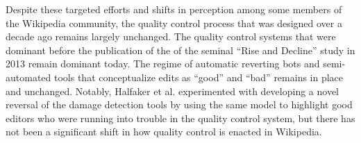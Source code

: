 Despite these targeted efforts and shifts in perception among some members of the Wikipedia community, the quality control process that was designed over a decade ago remains largely unchanged\cite{halfaker2014snuggle}.  The quality control systems that were dominant before the publication of the of the seminal ``Rise and Decline'' study in 2013\cite{halfaker2013rise} remain dominant today.  The regime of automatic reverting bots and semi-automated tools that conceptualize edits as ``good'' and ``bad'' remains in place and unchanged.  Notably, Halfaker et al. experimented with developing a novel reversal of the damage detection tools by using the same model to highlight good editors who were running into trouble in the quality control system\cite{halfaker2014snuggle}, but there has not been a significant shift in how quality control is enacted in Wikipedia.
